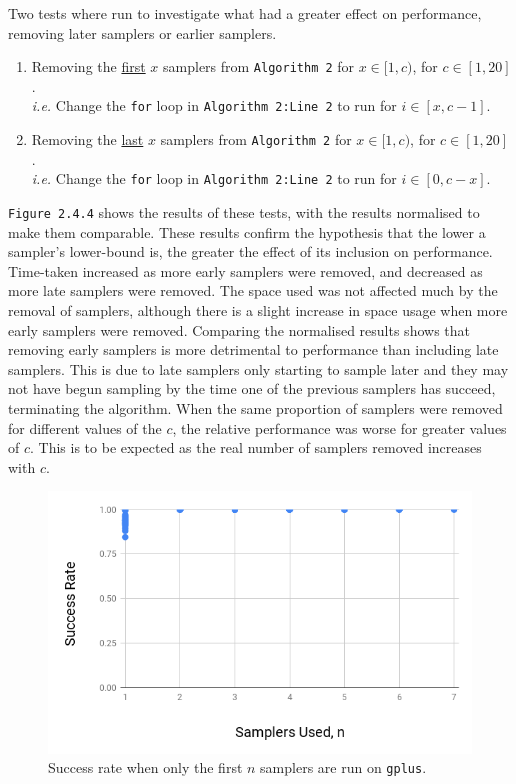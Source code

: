 \documentclass[11pt,twoside,a4paper]{report}
\begin{document}
\par Two tests where run to investigate what had a greater effect on performance, removing later samplers or earlier samplers.
\begin{enumerate}
	\item Removing the \underline{first} $x$ samplers from \texttt{Algorithm 2} for $x\in[1,c)$, for $c\in[1,20]$.\\
	\textit{i.e.} Change the \texttt{for} loop in \texttt{Algorithm 2:Line 2} to run for $i\in[x,c-1]$.
	\item Removing the \underline{last} $x$ samplers from \texttt{Algorithm 2} for $x\in[1,c)$, for $c\in[1,20]$.\\
	\textit{i.e.} Change the \texttt{for} loop in \texttt{Algorithm 2:Line 2} to run for $i\in[0,c-x]$.
\end{enumerate}

\par \texttt{Figure 2.4.4} shows the results of these tests, with the results normalised to make them comparable. These results confirm the hypothesis that the lower a sampler's lower-bound is, the greater the effect of its inclusion on performance. Time-taken increased as more early samplers were removed, and decreased as more late samplers were removed. The space used was not affected much by the removal of samplers, although there is a slight increase in space usage when more early samplers were removed. Comparing the normalised results shows that removing early samplers is more detrimental to performance than including late samplers. This is due to late samplers only starting to sample later and they may not have begun sampling by the time one of the previous samplers has succeed, terminating the algorithm. When the same proportion of samplers were removed for different values of the  $c$, the relative performance was worse for greater values of $c$. This is to be expected as the real number of samplers removed increases with $c$.

\begin{figure}[H]
	\label{Figure 6}
	\centering
	\includegraphics[width=.5\textwidth]{img/gplusSuccessRate.png}
	\caption{Success rate when only the first $n$ samplers are run on \texttt{gplus}.}
\end{figure}
\end{document}

